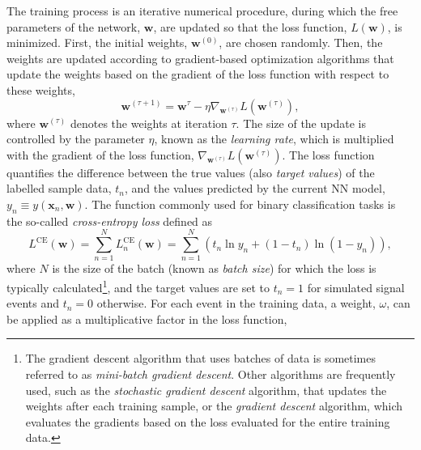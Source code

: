 The training process is an iterative numerical procedure, during which the free parameters of the network, $\pmb{w}$, are updated so that the loss function, $L(\pmb{w})$, is minimized. 
First, the initial weights, $\pmb{w}^{(0)}$, are chosen randomly. Then, the weights are updated according to gradient-based optimization algorithms that update the weights based on the gradient of the loss function with respect to these weights, 
\begin{equation}
    \label{eq:gradient-descent}
    \pmb{w}^{(\tau+1)} = \pmb{w}^\tau - \eta \nabla_{\pmb{w}^{(\tau)}} L(\pmb{w}^{(\tau)}),
\end{equation}
where $\pmb{w}^{(\tau)}$ denotes the weights at iteration $\tau$.
The size of the update is controlled by the parameter $\eta$, known as the \emph{learning rate}, which is multiplied with the gradient of the loss function, $\nabla_{\pmb{w}^{(\tau)}} L(\pmb{w}^{(\tau)})$.
The loss function quantifies the difference between the true values (also \emph{target values}) of the labelled sample data, $t_n$, and the values predicted by the current NN model, $y_n \equiv y(\pmb{x}_n, \pmb{w})$. 
The function commonly used for binary classification tasks is the so-called \emph{cross-entropy loss} defined as
\begin{equation}
    \label{eq:cross-entropy-loss}
    L^{\text{CE}}(\pmb{w}) = \sum _{n=1}^{N}L_n^{\text{CE}}(\pmb{w}) = \sum _{n=1}^{N}\left( t_n \ln y_n + ( 1 - t_n) \ln (1 - y_n) \right),
\end{equation}
where $N$ is the size of the batch (known as \emph{batch size}) for which the loss is typically calculated\footnote{The gradient descent algorithm that uses batches of data is sometimes referred to as \emph{mini-batch gradient descent}. Other algorithms are frequently used, such as the \emph{stochastic gradient descent} algorithm, that updates the weights after each training sample, or the \emph{gradient descent} algorithm, which evaluates the gradients based on the loss evaluated for the entire training data.}, and the target values are set to $t_n = 1$ for simulated signal events and $t_n = 0$ otherwise.
For each event in the training data, a weight, $\omega$, can be applied as a multiplicative factor in the loss function, 
